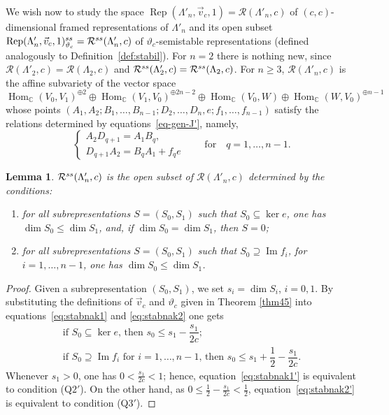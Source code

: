 \documentclass[11pt]{article}
\numberwithin{equation}{section}
\numberwithin{equation}{section}
\newtheorem{Lemma}[Theorem]{Lemma}
\begin{document}
We wish now to study the space $\operatorname{Rep}(\Lambda'_n, \vec{v}_c, 1) = \mathcal{R}(\Lambda'_n, c)$
of $(c,c)$-dimensional framed representations of $\Lambda'_{n}$ and its open subset
 $\operatorname{Rep}(\Lambda'_n, \vec{v}_c, 1)_{\vartheta_c}^{\rm ss} = \mathcal{R}^{\rm ss}(\Lambda'_n, c)$ of $\vartheta_c$-semistable representations
 (defined analogously to Definition~\ref{def:stabil}).
 For $n=2$ there is nothing new, since
 $\mathcal{R}(\Lambda'_2, c)=\mathcal{R}(\Lambda_2, c)$ and $\mathcal{R}^{\rm ss}(\Lambda'_2, c) = \mathcal{R}^{\rm ss}(\Lambda_2, c)$.
 For $n\geq3$, $\mathcal{R}(\Lambda'_n, c)$ is the affine subvariety of the vector space
\begin{equation*}
\operatorname{Hom}_\mathbb{C}(V_0,V_1)^{\oplus 2}\oplus\operatorname{Hom}_\mathbb{C}(V_1,V_0)^{\oplus 2n-2}\oplus\operatorname{Hom}_\mathbb{C}(V_0,W)\oplus\operatorname{Hom}_\mathbb{C}(W,V_0)^{\oplus n-1}
\end{equation*}
whose points $(A_1,A_2;B_1,\dots,B_{n-1};D_{2},\dots,D_{n},e;f_1,\dots,f_{n-1})$ satisfy the relations
determined by equations~\eqref{eq-gen-J'}, namely,
\begin{equation}
\begin{cases}
A_2D_{q+1}=A_1B_q,\\
D_{q+1}A_2=B_qA_1+f_{q}e
\end{cases}\qquad\text{for}\quad q=1,\dots,n-1 .
\label{eq-(Q1')}\tag{\rm Q$1'$}
\end{equation}

\begin{Lemma}\label{Q-Lemma}
$\mathcal{R}^{\rm ss}(\Lambda'_{n}, c)$ is the open subset of $\mathcal{R}(\Lambda'_{n}, c)$ determined by the conditions:
\begin{enumerate}\itemsep=0pt
 \item[\rm{(Q$2'$)}]
 for all subrepresentations $S=(S_0,S_1)$ such that $S_0\subseteq\ker e$, one has $\dim S_0\leq\dim S_1$, and, if $\dim S_0=\dim S_1$, then $S=0$;
 \item[\rm{(Q$3'$)}]
 for all subrepresentations $S=(S_0,S_1)$ such that $S_0\supseteq\operatorname{Im} f_i$, for $i=1,\dots,n-1$, one has $\dim S_0\leq\dim S_1$.
\end{enumerate}
\end{Lemma}
\begin{proof}
Given a subrepresentation $(S_{0},S_{1})$, we set $s_{i}=\dim S_{i}$, $i=0,1$. By substituting the definitions of $\vec{v}_c$ and $\vartheta_c$ given in Theorem \ref{thm45} into equations~\eqref{eq:stabnak1} and \eqref{eq:stabnak2} one gets
\begin{gather}
 \text{if $S_0\subseteq \ker e$, then $s_{0}\leq s_1-\dfrac{s_1}{2c}$} ;\label{eq:stabnak1'}\\
\text{if $S_0\supseteq \operatorname{Im} f_i$ for $i=1,\dots,n-1$, then $s_{0}\leq s_{1}+\dfrac{1}{2}-\dfrac{s_{1}}{2c}$} .\label{eq:stabnak2'}
\end{gather}
Whenever $s_1>0$, one has $0<\frac{s_1}{2c}<1$; hence, equation~\eqref{eq:stabnak1'} is equivalent to condition \rm{(Q$2'$)}. On the other hand, as $0\leq\frac{1}{2}-\frac{s_{1}}{2c}<\frac{1}{2}$, equation~\eqref{eq:stabnak2'} is equivalent to condition \rm{(Q$3'$)}.
\end{proof}
\end{document}
